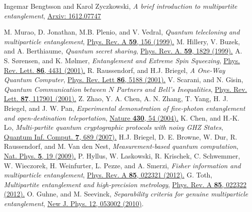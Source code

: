 \documentclass[pra,a4paper,aps,twocolumn,showpacs,superscriptaddress,groupedaddress]{revtex4}
\begin{document}
\begin{thebibliography}{1}

 Ingemar Bengtsson and Karol Zyczkowski, \emph{A brief introduction to multipartite entanglement}, \href{https://arxiv.org/abs/1612.07747}{Arxiv: 1612.07747}

 M. Murao, D. Jonathan, M.B. Plenio, and V. Vedral, \emph{Quantum telecloning and multiparticle entanglement}, \href{https://journals.aps.org/pra/abstract/10.1103/PhysRevA.59.156}{Phys. Rev. A \textbf{59}, 156 (1999).}
 M. Hillery, V. Buzek, and A. Berthiaume, \emph{Quantum secret sharing}, \href{https://journals.aps.org/pra/abstract/10.1103/PhysRevA.59.1829}{Phys. Rev. A. \textbf{59}, 1829 (1999).}
 A. S. S{\o}rensen, and K. M{\o}lmer, \emph{Entanglement and Extreme Spin Squeezing}, \href{https://journals.aps.org/prl/abstract/10.1103/PhysRevLett.86.4431}{Phys. Rev. Lett. \textbf{86}, 4431 (2001).}
 R. Raussendorf, and H.J. Briegel, \emph{A One-Way Quantum Computer}, \href{https://journals.aps.org/prl/abstract/10.1103/PhysRevLett.86.5188}{Phys. Rev. Lett \textbf{86}, 5188 (2001).}
 V. Scarani, and N. Gisin, \emph{Quantum Communication between $N$ Partners and Bell's Inequalities}, \href{https://journals.aps.org/prl/abstract/10.1103/PhysRevLett.87.117901}{Phys. Rev. Lett. \textbf{87}, 117901 (2001).}
 Z.  Zhao, Y. A. Chen, A. N. Zhang, T.  Yang, H. J.  Briegel, and J. W.  Pan, \emph{Experimental demonstration of five-photon entanglement and open-destination teleportation}, \href{https://www.nature.com/articles/nature02643}{Nature \textbf{430}, 54 (2004).}
 K. Chen, and H.-K. Lo, \emph{Multi-partite quantum cryptographic protocols with noisy GHZ States}, \href{https://dl.acm.org/citation.cfm?id=2011743}{Quantum Inf. Comput. \textbf{7}, 689 (2007).} 
 H.J. Briegel, D. E. Browne, W. Dur, R. Raussendorf, and M. Van den Nest, \emph{Measurement-based quantum computation}, \href{https://www.nature.com/articles/nphys1157}{Nat. Phys. \textbf{5}, 19 (2009).}
 P. Hyllus, W. Laskowski, R. Krischek, C. Schwemmer, W. Wieczorek, H. Weinfurter, L. Pezze, and A. Smerzi, \emph{Fisher information and multiparticle entanglement}, \href{https://journals.aps.org/pra/abstract/10.1103/PhysRevA.85.022321}{Phys. Rev. A \textbf{85}, 022321 (2012).}
 G. Toth, \emph{Multipartite entanglement and high-precision metrology},  \href{https://journals.aps.org/pra/abstract/10.1103/PhysRevA.85.022322}{Phys. Rev. A {\bf 85}, 022322 (2012).}
 O. Guhne,  and M. Seevinck,  \emph{Separability criteria for genuine multiparticle entanglement}, \href{https://iopscience.iop.org/article/10.1088/1367-2630/12/5/053002}{New J. Phys. 12, 053002 (2010)}.

\end{thebibliography}
\end{document}
